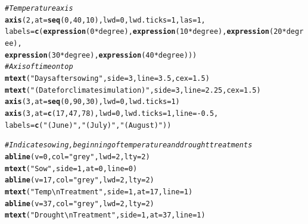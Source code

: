 \documentclass[11pt, oneside]{article}\usepackage[]{graphicx}\usepackage[]{color}
\makeatletter
\newcommand{\hlnum}[1]{\textcolor[rgb]{0.686,0.059,0.569}{#1}}%
\newcommand{\hlstr}[1]{\textcolor[rgb]{0.192,0.494,0.8}{#1}}%
\newcommand{\hlcom}[1]{\textcolor[rgb]{0.678,0.584,0.686}{\textit{#1}}}%
\newcommand{\hlopt}[1]{\textcolor[rgb]{0,0,0}{#1}}%
\newcommand{\hlstd}[1]{\textcolor[rgb]{0.345,0.345,0.345}{#1}}%
\newcommand{\hlkwc}[1]{\textcolor[rgb]{0.333,0.667,0.333}{#1}}%
\newcommand{\hlkwd}[1]{\textcolor[rgb]{0.737,0.353,0.396}{\textbf{#1}}}%
\newenvironment{kframe}{%
 \def\at@end@of@kframe{}%
 \ifinner\ifhmode%
  \def\at@end@of@kframe{\end{minipage}}%
  \begin{minipage}{\columnwidth}%
 \fi\fi%
 \def\FrameCommand##1{\hskip\@totalleftmargin \hskip-\fboxsep
 \colorbox{shadecolor}{##1}\hskip-\fboxsep
     \hskip-\linewidth \hskip-\@totalleftmargin \hskip\columnwidth}%
 \MakeFramed {\advance\hsize-\width
   \@totalleftmargin\z@ \linewidth\hsize
   \@setminipage}}%
 {\par\unskip\endMakeFramed%
 \at@end@of@kframe}
\newenvironment{knitrout}{}{} %
\makeatother
\begin{document}
\begin{knitrout}
\begin{kframe}
\begin{alltt}
\hlcom{# Temperature axis}
\hlkwd{axis}\hlstd{(}\hlnum{2}\hlstd{,} \hlkwc{at} \hlstd{=} \hlkwd{seq}\hlstd{(}\hlnum{0}\hlstd{,} \hlnum{40}\hlstd{,} \hlnum{10}\hlstd{),} \hlkwc{lwd} \hlstd{=} \hlnum{0}\hlstd{,} \hlkwc{lwd.ticks} \hlstd{=} \hlnum{1}\hlstd{,} \hlkwc{las} \hlstd{=} \hlnum{1}\hlstd{,}
        \hlkwc{labels} \hlstd{=} \hlkwd{c}\hlstd{(}\hlkwd{expression}\hlstd{(}\hlnum{0}\hlopt{*}\hlstd{degree),} \hlkwd{expression}\hlstd{(}\hlnum{10}\hlopt{*}\hlstd{degree),} \hlkwd{expression}\hlstd{(}\hlnum{20}\hlopt{*}\hlstd{degree),}
                                                 \hlkwd{expression}\hlstd{(}\hlnum{30}\hlopt{*}\hlstd{degree),} \hlkwd{expression}\hlstd{(}\hlnum{40}\hlopt{*}\hlstd{degree)))}
\hlcom{# Axis of time on top}
\hlkwd{mtext}\hlstd{(}\hlstr{"Days after sowing"}\hlstd{,} \hlkwc{side} \hlstd{=} \hlnum{3}\hlstd{,} \hlkwc{line} \hlstd{=} \hlnum{3.5}\hlstd{,} \hlkwc{cex} \hlstd{=} \hlnum{1.5}\hlstd{)}
\hlkwd{mtext}\hlstd{(}\hlstr{"(Date for climate simulation)"}\hlstd{,} \hlkwc{side} \hlstd{=} \hlnum{3}\hlstd{,} \hlkwc{line} \hlstd{=} \hlnum{2.25}\hlstd{,} \hlkwc{cex} \hlstd{=} \hlnum{1.5}\hlstd{)}
\hlkwd{axis}\hlstd{(}\hlnum{3}\hlstd{,} \hlkwc{at} \hlstd{=} \hlkwd{seq}\hlstd{(}\hlnum{0}\hlstd{,} \hlnum{90}\hlstd{,} \hlnum{30}\hlstd{),} \hlkwc{lwd} \hlstd{=} \hlnum{0}\hlstd{,} \hlkwc{lwd.ticks} \hlstd{=} \hlnum{1}\hlstd{)}
\hlkwd{axis}\hlstd{(}\hlnum{3}\hlstd{,} \hlkwc{at} \hlstd{=} \hlkwd{c}\hlstd{(}\hlnum{17}\hlstd{,} \hlnum{47}\hlstd{,} \hlnum{78}\hlstd{),} \hlkwc{lwd} \hlstd{=} \hlnum{0}\hlstd{,} \hlkwc{lwd.ticks} \hlstd{=} \hlnum{1}\hlstd{,} \hlkwc{line} \hlstd{=} \hlopt{-}\hlnum{0.5}\hlstd{,}
     \hlkwc{labels} \hlstd{=} \hlkwd{c}\hlstd{(}\hlstr{"(June)"}\hlstd{,} \hlstr{"(July)"}\hlstd{,} \hlstr{"(August)"}\hlstd{))}

\hlcom{# Indicate sowing, beginning of temperature and drought treatments}
\hlkwd{abline}\hlstd{(}\hlkwc{v} \hlstd{=} \hlnum{0}\hlstd{,} \hlkwc{col} \hlstd{=} \hlstr{"grey"}\hlstd{,} \hlkwc{lwd} \hlstd{=} \hlnum{2}\hlstd{,} \hlkwc{lty} \hlstd{=} \hlnum{2}\hlstd{)}
\hlkwd{mtext}\hlstd{(}\hlstr{"Sow"}\hlstd{,} \hlkwc{side} \hlstd{=} \hlnum{1}\hlstd{,} \hlkwc{at} \hlstd{=} \hlnum{0}\hlstd{,} \hlkwc{line} \hlstd{=} \hlnum{0}\hlstd{)}
\hlkwd{abline}\hlstd{(}\hlkwc{v} \hlstd{=} \hlnum{17}\hlstd{,} \hlkwc{col} \hlstd{=} \hlstr{"grey"}\hlstd{,} \hlkwc{lwd} \hlstd{=} \hlnum{2}\hlstd{,} \hlkwc{lty} \hlstd{=} \hlnum{2}\hlstd{)}
\hlkwd{mtext}\hlstd{(}\hlstr{"Temp\textbackslash{}nTreatment"}\hlstd{,} \hlkwc{side} \hlstd{=} \hlnum{1}\hlstd{,} \hlkwc{at} \hlstd{=} \hlnum{17}\hlstd{,} \hlkwc{line} \hlstd{=} \hlnum{1}\hlstd{)}
\hlkwd{abline}\hlstd{(}\hlkwc{v} \hlstd{=} \hlnum{37}\hlstd{,} \hlkwc{col} \hlstd{=} \hlstr{"grey"}\hlstd{,} \hlkwc{lwd} \hlstd{=} \hlnum{2}\hlstd{,} \hlkwc{lty} \hlstd{=} \hlnum{2}\hlstd{)}
\hlkwd{mtext}\hlstd{(}\hlstr{"Drought\textbackslash{}nTreatment"}\hlstd{,} \hlkwc{side} \hlstd{=} \hlnum{1}\hlstd{,} \hlkwc{at} \hlstd{=} \hlnum{37}\hlstd{,} \hlkwc{line} \hlstd{=} \hlnum{1}\hlstd{)}


\end{alltt}
\end{kframe}
\end{knitrout}
\end{document}
